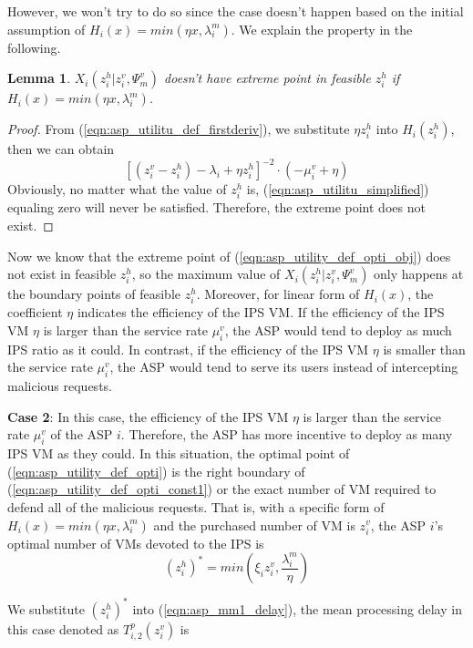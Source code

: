 \documentclass[conference]{IEEEtran}
\newtheorem{lemma}{Lemma}
\begin{document}
However, we won't try to do so since the case doesn't happen based on the initial assumption of $H_i(x) = min(\eta{x}, \lambda_i^m)$. We explain the property in the following.
\begin{lemma} \label{lemma:asp_case1_not_exist}
$X_i(z_i^h|z_i^v,\Psi_m^v)$ doesn't have extreme point in feasible $z_i^h$ if $H_i(x) = min(\eta{x}, \lambda_i^m)$.
\end{lemma}
\begin{proof}
From (\ref{eqn:asp_utilitu_def_firstderiv}),  we substitute $\eta{z_i^h}$ into $H_i(z_i^h)$, then we can obtain
\begin{equation} \label{eqn:asp_utilitu_simplified}
[(z_i^v - z_i^h) - \lambda_i + \eta{z_i^h}]^{-2} \cdot (-\mu_i^v + \eta)
\end{equation}
Obviously, no matter what the value of $z_i^h$ is, (\ref{eqn:asp_utilitu_simplified}) equaling zero will never be satisfied. Therefore, the extreme point does not exist.\qedhere
\end{proof}
Now we know that the extreme point of (\ref{eqn:asp_utility_def_opti_obj}) does not exist in feasible $z_i^h$, so the maximum value of $X_i(z_i^h|z_i^v,\Psi_m^v)$ only happens at the boundary points of feasible $z_i^h$. Moreover, for linear form of $H_i(x)$, the coefficient $\eta$ indicates the efficiency of the IPS VM. If the efficiency of the IPS VM $\eta$ is larger than the service rate $\mu_i^v$, the ASP would tend to deploy as much IPS ratio as it could. In contrast, if the efficiency of the IPS VM $\eta$ is smaller than the service rate $\mu_i^v$, the ASP would tend to serve its users instead of intercepting malicious requests. 

\textbf{Case 2}: In this case, the efficiency of the IPS VM $\eta$ is larger than the service rate $\mu_i^v$ of the ASP $i$. Therefore, the ASP has more incentive to deploy as many IPS VM as they could. In this situation, the optimal point of (\ref{eqn:asp_utility_def_opti}) is the right boundary of (\ref{eqn:asp_utility_def_opti_const1}) or the exact number of VM required to defend all of the malicious requests. That is, with a specific form of $H_i(x) = min(\eta x, \lambda_i^m)$ and the purchased number of VM is $z_i^v$, the ASP $i$'s optimal number of VMs devoted to the IPS is
\begin{equation} \label{eqn:asp_utility_def_first_boundary}
(z_i^h)^* = min(\xi_i z_i^v, \frac{\lambda_i^m}{\eta})
\end{equation}

We substitute $(z_i^h)^*$ into (\ref{eqn:asp_mm1_delay}), the mean processing delay in this case denoted as $T_{i,2}^p(z_i^v)$ is
\end{document}
